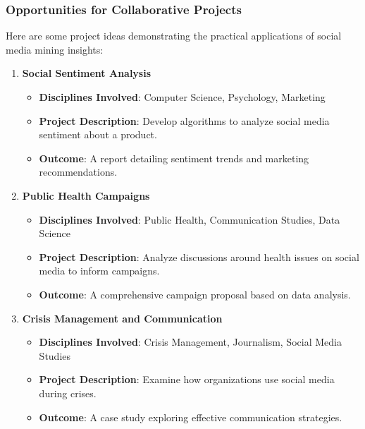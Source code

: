 \documentclass{beamer}
\begin{document}
\begin{frame}[fragile]
    \frametitle{Opportunities for Collaborative Projects}
    
    Here are some project ideas demonstrating the practical applications of social media mining insights:

    \begin{enumerate}
        \item \textbf{Social Sentiment Analysis}
            \begin{itemize}
                \item \textbf{Disciplines Involved}: Computer Science, Psychology, Marketing
                \item \textbf{Project Description}: Develop algorithms to analyze social media sentiment about a product.
                \item \textbf{Outcome}: A report detailing sentiment trends and marketing recommendations.
            \end{itemize}

        \item \textbf{Public Health Campaigns}
            \begin{itemize}
                \item \textbf{Disciplines Involved}: Public Health, Communication Studies, Data Science
                \item \textbf{Project Description}: Analyze discussions around health issues on social media to inform campaigns.
                \item \textbf{Outcome}: A comprehensive campaign proposal based on data analysis.
            \end{itemize}

        \item \textbf{Crisis Management and Communication}
            \begin{itemize}
                \item \textbf{Disciplines Involved}: Crisis Management, Journalism, Social Media Studies
                \item \textbf{Project Description}: Examine how organizations use social media during crises.
                \item \textbf{Outcome}: A case study exploring effective communication strategies.
            \end{itemize}
    \end{enumerate}
\end{frame}
\end{document}
